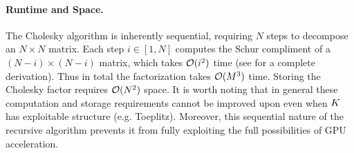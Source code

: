 \paragraph{Runtime and Space.}
The Cholesky algorithm is inherently sequential, requiring $N$ steps to decompose an $N \times N$ matrix.
Each step $i \in [1, N]$ computes the Schur compliment of a $(N-i) \times (N-i)$ matrix, which takes $\bigo{i^2}$ time (see \citep[][Sec. 4.2]{golub2012matrix} for a complete derivation).
Thus in total the factorization takes $\bigo{M^3}$ time.
Storing the Cholesky factor requires $\bigo{N^2}$ space.
It is worth noting that in general these computation and storage requirements cannot be improved upon even when $K$ has exploitable structure (e.g. Toeplitz).
Moreover, this sequential nature of the recursive algorithm prevents it from fully exploiting the full possibilities of GPU acceleration.



